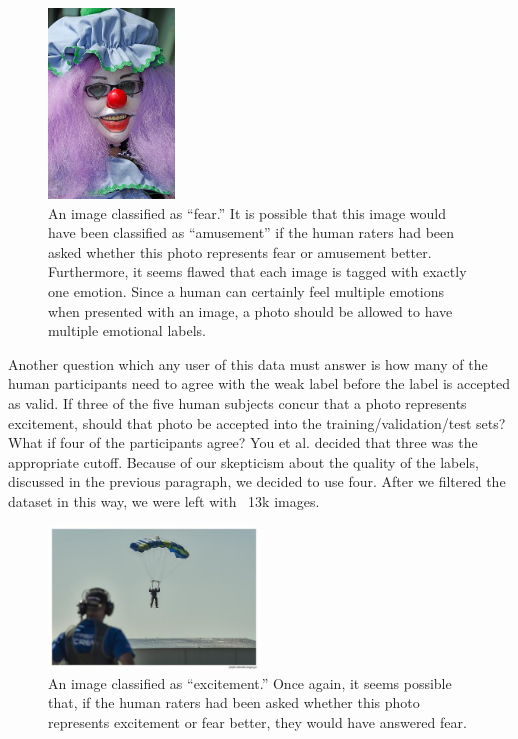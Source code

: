 \documentclass[10pt,twocolumn,letterpaper]{article}
\begin{document}
\begin{figure}
\centering
\includegraphics[width=0.3\textwidth]{fear-394.png}
\caption{An image classified as ``fear.'' It is possible that this image would have been classified as ``amusement'' if the human raters had been asked whether this photo represents fear or amusement better. Furthermore, it seems flawed that each image is tagged with exactly one emotion. Since a human can certainly feel multiple emotions when presented with an image, a photo should be allowed to have multiple emotional labels.}
\end{figure}

Another question which any user of this data must answer is how many of the human participants need to agree with the weak label before the label is accepted as valid. If three of the five human subjects concur that a photo represents excitement, should that photo be accepted into the training/validation/test sets? What if four of the participants agree? You et al. decided that three was the appropriate cutoff. Because of our skepticism about the quality of the labels, discussed in the previous paragraph, we decided to use four. After we filtered the dataset in this way, we were left with ~13k images.

\begin{figure}
\centering
\includegraphics[width=0.5\textwidth]{excitement-1220.png}
\caption{An image classified as ``excitement.'' Once again, it seems possible that, if the human raters had been asked whether this photo represents excitement or fear better, they would have answered fear.}
\end{figure}
\end{document}
